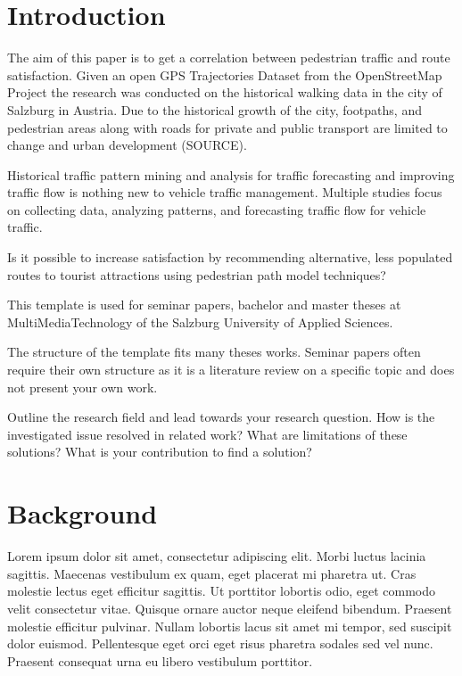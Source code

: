 

\section{Introduction}
\label{section:Introduction}

The aim of this paper is to get a correlation between pedestrian traffic and route satisfaction. Given an open GPS Trajectories Dataset from the OpenStreetMap Project the research was conducted on the historical walking data in the city of Salzburg in Austria. Due to the historical growth of the city, footpaths, and pedestrian areas along with roads for private and public transport are limited to change and urban development (SOURCE). 

Historical traffic pattern mining and analysis for traffic forecasting and improving traffic flow is nothing new to vehicle traffic management. Multiple studies focus on collecting data, analyzing patterns, and forecasting traffic flow for vehicle traffic. 

Is it possible to increase satisfaction by recommending alternative, less populated routes to tourist attractions using pedestrian path model techniques?

This template is used for seminar papers, bachelor and master theses at MultiMediaTechnology of the Salzburg University of Applied Sciences. 

The structure of the template fits many theses works. Seminar papers often require their own structure as it is a literature review on a specific topic and does not present your own work.

Outline the research field and lead towards your research question. How is the investigated issue resolved in related work? What are limitations of these solutions? What is your contribution to find a solution?

\section{Background}
Lorem ipsum dolor sit amet, consectetur adipiscing elit. Morbi luctus lacinia sagittis. Maecenas vestibulum ex quam, eget placerat mi pharetra ut. Cras molestie lectus eget efficitur sagittis. Ut porttitor lobortis odio, eget commodo velit consectetur vitae. Quisque ornare auctor neque eleifend bibendum. Praesent molestie efficitur pulvinar. Nullam lobortis lacus sit amet mi tempor, sed suscipit dolor euismod. Pellentesque eget orci eget risus pharetra sodales sed vel nunc. Praesent consequat urna eu libero vestibulum porttitor.

